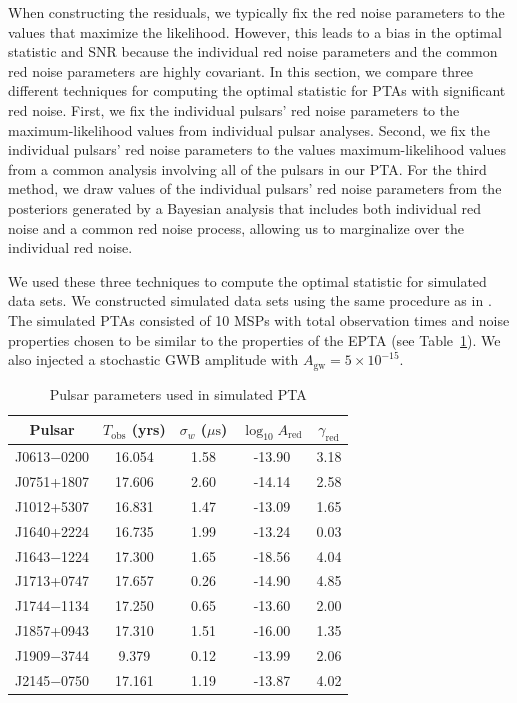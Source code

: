 \documentclass[twocolumn,aps,prd,superscriptaddress]{revtex4-1}
\newcommand{\Agw}{\ensuremath{A_\mathrm{gw}}}
\begin{document}
When constructing the residuals, 
we typically fix the red noise parameters to the values that 
maximize the likelihood. 
However, this leads to a bias in the optimal statistic and SNR because 
the individual red noise parameters and the common red noise parameters 
are highly covariant. 
In this section, we compare three different techniques for computing the 
optimal statistic for PTAs with significant red noise. 
First, we fix the individual pulsars' red noise parameters to the 
maximum-likelihood values from individual pulsar analyses. 
Second, we fix the individual pulsars' red noise parameters to the 
values maximum-likelihood values from a common analysis 
involving all of the pulsars in our PTA. 
For the third method, we draw values of the individual pulsars' 
red noise parameters from the posteriors generated by a Bayesian analysis 
that includes both individual red noise and a common red noise process, 
allowing us to marginalize over the individual red noise.

We used these three techniques to compute the optimal statistic for simulated data sets. 
We constructed simulated data sets using the same procedure as in \citet{tlb+2017}. 
The simulated PTAs consisted of 10 MSPs with 
total observation times and noise properties chosen to be 
similar to the properties of the EPTA \cite{caballero+2016} (see Table~\ref{tab:sim}). 
We also injected a stochastic GWB amplitude with $\Agw = 5\times10^{-15}$.
\begin{table}[htb]
	\setlength{\tabcolsep}{5pt}
	\caption{Pulsar parameters used in simulated PTA}
	\begin{center}
	\begin{tabular}{ccccc}
		\hline\hline
    		Pulsar	& $T_\mathrm{obs}$ (yrs) & $\sigma_w$ ($\mu\mathrm{s}$) & $\log_{10}A_\mathrm{red}$ & $\gamma_\mathrm{red}$ \\
		\hline
		J0613$-$0200 & 16.054 & 1.58 & -13.90 & 3.18 \\
		J0751+1807 & 17.606 & 2.60 & -14.14 & 2.58 \\
		J1012+5307 & 16.831 & 1.47 & -13.09 & 1.65 \\
		J1640+2224 & 16.735 & 1.99 & -13.24 & 0.03 \\
		J1643$-$1224 & 17.300 & 1.65 & -18.56 & 4.04 \\
		J1713+0747 & 17.657 & 0.26 & -14.90 & 4.85 \\
		J1744$-$1134 & 17.250 & 0.65 & -13.60 & 2.00 \\
		J1857+0943 & 17.310 & 1.51 & -16.00 & 1.35 \\
		J1909$-$3744 & 9.379 & 0.12 & -13.99 & 2.06 \\
		J2145$-$0750 & 17.161 & 1.19 & -13.87 & 4.02 \\
    		\hline\hline
	\end{tabular}
	\end{center}
	\label{tab:sim}
\end{table}
\end{document}

